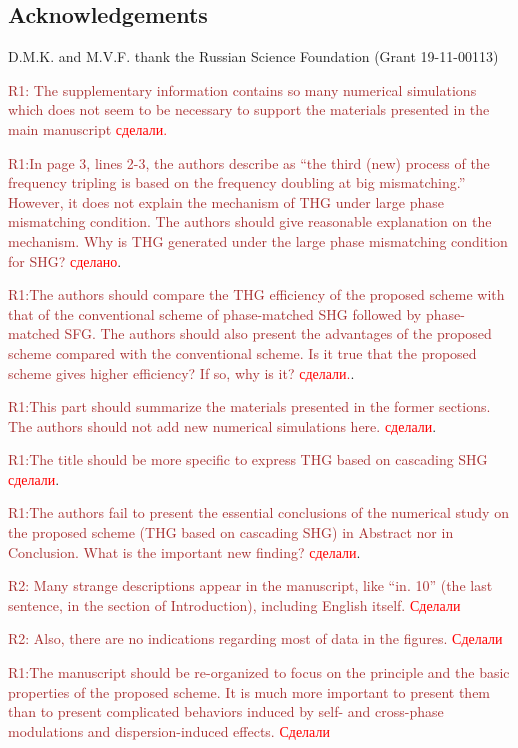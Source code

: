 \documentclass[a4paper, 12pt, onecolumn]{extarticle}
\begin{document}
\subsection*{Acknowledgements}
D.M.K. and M.V.F. thank the Russian Science Foundation (Grant 19-11-00113)

\textcolor{brown}{R1: The supplementary information contains so many numerical simulations which does not seem to be necessary to support the materials presented in the main manuscript} \textcolor{red}{сделали.}

\textcolor{brown}{R1:In page 3, lines 2-3, the authors describe as “the third (new) process of the frequency tripling is based on the frequency doubling at big mismatching.” However, it does not explain the mechanism of THG under large phase mismatching condition. The authors should give reasonable explanation on the mechanism. Why is THG generated under the large phase mismatching condition for SHG?}
\textcolor{red}{ сделано}.

\textcolor{brown}{R1:The authors should compare the THG efficiency of the proposed scheme with that of the conventional scheme of phase-matched SHG followed by phase-matched SFG. The authors should also present the advantages of the proposed scheme compared with the conventional scheme. Is it true that the proposed scheme gives higher efficiency? If so, why is it?} \textcolor{red}{ сделали.}. 


\textcolor{brown}{R1:This part should summarize the materials presented in the former sections. The authors should not add new numerical simulations here.} \textcolor{red}{сделали}.

\textcolor{brown}{R1:The title should be more specific to express THG based on cascading SHG} \textcolor{red}{сделали}.

\textcolor{brown}{R1:The authors fail to present the essential conclusions of the numerical study on the proposed scheme (THG based on cascading SHG) in Abstract nor in Conclusion. What is the important new finding?} \textcolor{red}{сделали}.

 \textcolor{brown}{R2: Many strange descriptions appear in the manuscript, like “in. 10” (the last sentence, in the section of Introduction), including English itself.} \textcolor{red}{ Сделали}
 
 \textcolor{brown}{R2: Also, there are no indications regarding most of data in the figures.}
 \textcolor{red}{ Сделали}
 
\textcolor{brown}{R1:The manuscript should be re-organized to focus on the principle and the basic properties of the proposed scheme. It is much more important to present them than to present complicated behaviors induced by self- and cross-phase modulations and dispersion-induced effects.}
\textcolor{red}{ Сделали} 
 
\end{document}
